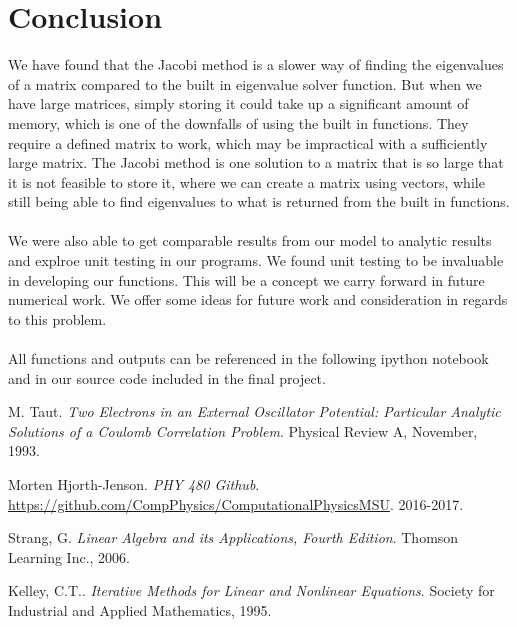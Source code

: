 \documentclass{article}
\begin{document}
\section{Conclusion}
We have found that the Jacobi method is a slower way of finding the eigenvalues of a matrix compared to the built in eigenvalue solver function. But when we have large matrices, simply storing it could take up a significant amount of memory, which is one of the downfalls of using the built in functions. They require a defined matrix to work, which may be impractical with a sufficiently large matrix. The Jacobi method is one solution to a matrix that is so large that it is not feasible to store it, where we can create a matrix using vectors, while still being able to find eigenvalues to what is returned from the built in functions.\\
\\
We were also able to get comparable results from our model to analytic results and explroe unit testing in our programs. We found unit testing to be invaluable in developing our functions. This will be a concept we carry forward in future numerical work. We offer some ideas for future work and consideration in regards to this problem.\\
\\
All functions and outputs can be referenced in the following ipython notebook and in our source code included in the final project.

\begin{thebibliography}{4}
 M. Taut. \textit{Two Electrons in an External Oscillator Potential: Particular Analytic Solutions of a Coulomb Correlation Problem}. Physical Review A, November, 1993.  

 Morten Hjorth-Jenson. \textit{PHY 480 Github}.\\ \url{https://github.com/CompPhysics/ComputationalPhysicsMSU}. 2016-2017.

 Strang, G. \textit{Linear Algebra and its Applications, Fourth Edition}. Thomson Learning Inc., 2006.

 Kelley, C.T.. \textit{Iterative Methods for Linear
and Nonlinear Equations}. Society for Industrial and Applied Mathematics, 1995.


\end{thebibliography}

%
\end{document}
